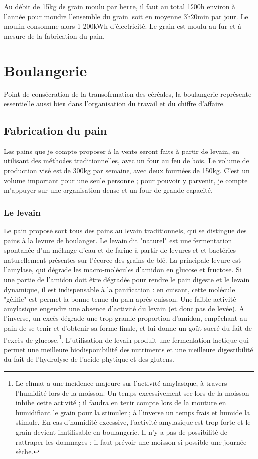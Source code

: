 \documentclass{book}
\begin{document}
Au débit de 15kg de grain moulu par heure, il faut au total 1200h environ à l'année pour moudre l'ensemble du grain, soit en moyenne 3h20min par jour. Le moulin consomme alors 1 200kWh d'électricité. Le grain est moulu au fur et à mesure de la fabrication du pain. 

\section{Boulangerie}

Point de consécration de la transofrmation des céréales, la boulangerie représente essentielle aussi bien dans l'organisation du travail et du chiffre d'affaire.

\subsection{Fabrication du pain}

Les pains que je compte proposer à la vente seront faits à partir de levain, en utilisant des méthodes traditionnelles, avec un four au feu de bois. Le volume de production visé est de 300kg par semaine, avec deux fournées de 150kg. C'est un volume important pour une seule personne ; pour pouvoir y parvenir, je compte m'appuyer sur une organisation dense et un four de grande capacité. 

\subsubsection{Le levain}

Le pain proposé sont tous des pains au levain traditionnels, qui se distingue des pains à la levure de boulanger. Le levain dit "naturel" est une fermentation spontanée d'un mélange d’eau et de farine à partir de levures et et bactéries naturellement présentes sur l'écorce des grains de blé. La principale levure est  l'amylase, qui dégrade les macro-molécules d'amidon en glucose et fructose. Si une partie de l'amidon doit être dégradée pour rendre le pain digeste et le levain dynamique, il est indispensable à la panification : en cuisant, cette molécule "gélifie" est permet la bonne tenue du pain après cuisson. Une faible activité amylasique engendre une absence d'activité du levain (et donc pas de levée). A l'inverse, un excès dégrade une trop grande proportion d'amidon, empêchant au pain de se tenir et d'obtenir sa forme finale, et lui donne un goût sucré du fait de l'excès de glucose.\footnote{Le climat a une incidence majeure sur l'activité amylasique, à travers l'humidité lors de la moisson. Un temps excessivement sec lors de la moisson inhibe cette activité ; il faudra en tenir compte lors de la mouture en humidifiant le grain pour la stimuler ; à l'inverse un temps frais et humide la stimule. En cas d'humidité excessive, l'activité amylasique est trop forte et le grain devient inutilisable en boulangerie. Il n'y a pas de possibilité de rattraper les dommages : il faut prévoir une moisson si possible une journée sèche. }. L’utilisation de levain produit une fermentation lactique qui permet une meilleure biodisponibilité des nutriments et une meilleure digestibilité du fait de l’hydrolyse de l’acide phytique et des glutens.
\end{document}
